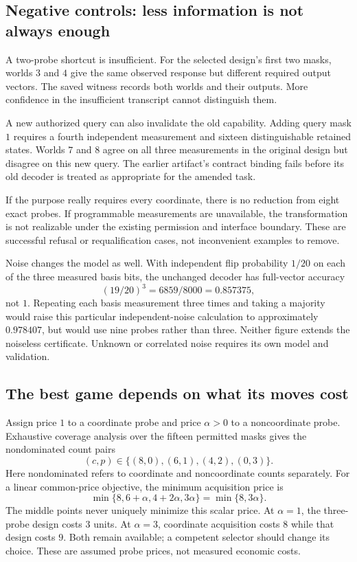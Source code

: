 \documentclass[11pt,letterpaper]{article}
\theoremstyle{remark}\newtheorem{remark}{Remark}[section]
\begin{document}
\subsection{Negative controls: less information is not always enough}
A two-probe shortcut is insufficient. For the selected design's first two masks, worlds $3$ and $4$ give the same observed response but different required output vectors. The saved witness records both worlds and their outputs. More confidence in the insufficient transcript cannot distinguish them.

A new authorized query can also invalidate the old capability. Adding query mask $1$ requires a fourth independent measurement and sixteen distinguishable retained states. Worlds $7$ and $8$ agree on all three measurements in the original design but disagree on this new query. The earlier artifact's contract binding fails before its old decoder is treated as appropriate for the amended task.

If the purpose really requires every coordinate, there is no reduction from eight exact probes. If programmable measurements are unavailable, the transformation is not realizable under the existing permission and interface boundary. These are successful refusal or requalification cases, not inconvenient examples to remove.

Noise changes the model as well. With independent flip probability $1/20$ on each of the three measured basis bits, the unchanged decoder has full-vector accuracy
\begin{equation}
 (19/20)^3=6859/8000=0.857375,
\end{equation}
not $1$. Repeating each basis measurement three times and taking a majority would raise this particular independent-noise calculation to approximately $0.978407$, but would use nine probes rather than three. Neither figure extends the noiseless certificate. Unknown or correlated noise requires its own model and validation.

\subsection{The best game depends on what its moves cost}
Assign price $1$ to a coordinate probe and price $\alpha>0$ to a noncoordinate probe. Exhaustive coverage analysis over the fifteen permitted masks gives the nondominated count pairs
\begin{equation}
 (c,p)\in\{(8,0),(6,1),(4,2),(0,3)\}.
\end{equation}
Here nondominated refers to coordinate and noncoordinate counts separately. For a linear common-price objective, the minimum acquisition price is
\begin{equation}\label{eq:price}
 \min\{8,6+\alpha,4+2\alpha,3\alpha\}=\min\{8,3\alpha\}.
\end{equation}
The middle points never uniquely minimize this scalar price. At $\alpha=1$, the three-probe design costs $3$ units. At $\alpha=3$, coordinate acquisition costs $8$ while that design costs $9$. Both remain available; a competent selector should change its choice. These are assumed probe prices, not measured economic costs.
\end{document}
